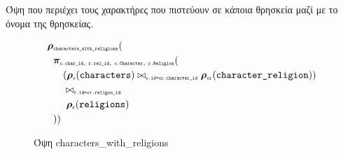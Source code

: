 \documentclass[../main.tex]{subfiles}
\begin{document}
\noindent
Όψη που περιέχει τους χαρακτήρες που πιστεύουν σε κάποια θρησκεία μαζί με το
όνομα της θρησκείας.
\begin{figure}[H]
	\begin{equation}
		\begin{aligned}
			\bm{\rho} & _{\tsub{characters\_with\_religions}} (                                                                                                     \\
			          & \bm{\pi}_{\tsub{c.char\_id, r.rel\_id, c.Character, r.Religion}} (                                                                          \\
			          & \quad(\bm{\rho}_{\tsub{c}}(\texttt{characters}) \bowtie_{\tsub{c.id=cr.character\_id}} \bm{\rho}_{\tsub{cr}}(\texttt{character\_religion})) \\
			          & \quad\bowtie_{\tsub{r.id=cr.religon\_id}}                                                                                                   \\
			          & \quad\ \bm{\rho}_{\tsub{r}}(\texttt{religions})                                                                                             \\
			          & ))
		\end{aligned}
	\end{equation}
	\caption{Όψη characters\_with\_religions}
\end{figure}
\end{document}
